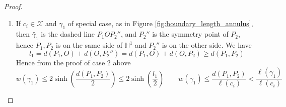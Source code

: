 \documentclass[11pt, a4paper]{article}
\newtheorem{lemma}[thm]{Lemma}
\theoremstyle{definition}
\theoremstyle{remark}
\newcommand{\bbh}{\mathbb{H}}
\newcommand{\calx}{\mathcal{X}}
\newcommand{\abs}[1]{\left| #1 \right|}
\newcommand{\bracket}[1]{\left( #1 \right)}
\begin{document}
\begin{proof}
\begin{enumerate}
\item
If $c_i\in\calx$ and $\gamma_1$ of special case, as in Figure \ref{fig:boundary_length_annulus}, then $\widetilde{\gamma_1}$ is the dashed line $P_1OP_2''$, and $P_2''$ is the symmetry point of $P_2$, hence $P_1,P_2$ is on the same side of $\bbh^1$ and $P_2''$ is on the other side. We have
$$l_1=d(P_1,O)+d(O,P_2'')=d(P_1,O)+d(O,P_2)\geqslant d(P_1,P_2)$$
Hence from the proof of case 2 above
$$w(\gamma_1)\leqslant 2\sinh\bracket{\frac{d(P_1,P_2)}2}\leqslant 2\sinh\bracket{\frac{l_1}2}\qquad w(\gamma_1)\leqslant\frac{d(P_1,P_2)}{\ell(c_i)}<\frac{\ell(\gamma_1)}{\ell(c_i)}$$

\end{enumerate}


\end{proof}

\end{document}
